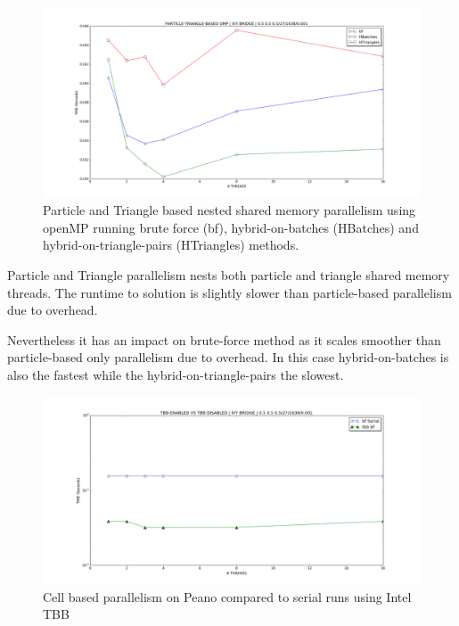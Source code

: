 \begin{figure}[htb]
  \begin{center}
    \includegraphics[width=1\textwidth]{experiments/random/omp/particle_triangle_based_x0.png}
  \end{center}
  \caption{Particle and Triangle based nested shared memory parallelism using openMP running brute force (bf), hybrid-on-batches (HBatches) and hybrid-on-triangle-pairs (HTriangles) methods.}
  \label{figure:particletriangle_omp}
\end{figure}

Particle and Triangle parallelism nests both particle and triangle shared memory threads. The runtime to solution is slightly slower than particle-based parallelism due to overhead. 

Nevertheless it has an impact on brute-force method as it scales smoother than particle-based only parallelism due to overhead. In this case hybrid-on-batches is also the fastest while the hybrid-on-triangle-pairs the slowest. 



\begin{figure}[htb]
  \begin{center}
    \includegraphics[width=1\textwidth]{experiments/random/omp/tbb_vs_serial.png}
  \end{center}
  \caption{Cell based parallelism on Peano compared to serial runs using Intel TBB}
  \label{figure:tbb_vs_serial}
\end{figure}

